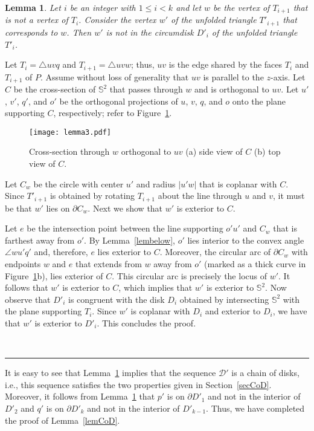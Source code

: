 \documentclass[12pt]{article}
\newtheorem{lemma}{Lemma}
\newcommand{\IS}{\mathbb{S}}
\newcommand{\qed}{\rule{0.5em}{1.5ex}}
\newcommand{\fqed}{{\hfill~\qed}}
\newenvironment{proof}{{\noindent \bf Proof.}}
                      {{\hfill \fqed} \vspace{1em}}
\begin{document}
\begin{lemma}   \label{lemlocallyD} 
Let $i$ be an integer with $1 \leq i < k$ and let $w$ be the vertex of 
$T_{i+1}$ that is not a vertex of $T_i$. Consider the vertex $w'$ of the 
unfolded triangle $T'_{i+1}$ that corresponds to $w$. Then $w'$ is not in 
the circumdisk $D'_i$ of the unfolded triangle $T'_i$.  
\end{lemma} 
\begin{proof}  
Let $T_i = \triangle uvq$ and $T_{i+1} = \triangle uvw$; thus, $uv$ is 
the edge shared by the faces $T_i$ and $T_{i+1}$ of $P$. Assume without 
loss of generality that $uv$ is parallel to the $z$-axis. Let $C$ be 
the cross-section of $\IS^2$ that passes through $w$ and is orthogonal 
to $uv$. Let $u'$, $v'$, $q'$, and $o'$ be the orthogonal projections 
of $u$, $v$, $q$, and $o$ onto the plane supporting $C$, respectively; 
refer to Figure~\ref{fig:lem3}.

\begin{figure}
\centering
\texttt{[image: lemma3.pdf]}
\caption{Cross-section through $w$ orthogonal to $uv$ (a) side view 
of $C$ (b) top view of $C$. }
\label{fig:lem3}
\end{figure}


Let $C_w$ be the circle with center $u'$ and radius $|u'w|$ that is 
coplanar with $C$. Since $T'_{i+1}$ is obtained by rotating $T_{i+1}$ 
about the line through $u$ and $v$, it must be that $w'$ lies on 
$\partial C_w$. Next we show that $w'$ is exterior to $C$.

Let $e$ be the intersection point between the line supporting $o'u'$ 
and $C_w$ that is farthest away from $o'$. By Lemma~\ref{lembelow}, 
$o'$ lies interior to the convex angle $\angle{wu'q'}$ and, therefore, 
$e$ lies exterior to $C$. Moreover, the circular arc of $\partial C_w$ 
with endpoints $w$ and $e$ that extends from $w$ away from $o'$ 
(marked as a thick curve in Figure~\ref{fig:lem3}b), lies exterior of 
$C$. This circular arc is precisely the locus of $w'$. It follows that 
$w'$ is exterior to $C$, which implies that $w'$ is exterior to 
$\IS^2$. Now observe that $D'_i$ is congruent with the disk $D_i$ 
obtained by intersecting $\IS^2$ with the plane supporting $T_i$. 
Since $w'$ is coplanar with $D_i$ and exterior to $D_i$, we have 
that $w'$ is exterior to $D'_i$. This concludes the proof.
\end{proof} 

It is easy to see that Lemma~\ref{lemlocallyD} implies that the sequence 
$\mathcal{D'}$ is a chain of disks, i.e., this sequence satisfies the 
two properties given in Section~\ref{secCoD}. Moreover, it follows from 
Lemma~\ref{lemlocallyD} that $p'$ is on $\partial D'_1$ and not in the 
interior of $D'_2$ and $q'$ is on $\partial D'_k$ and not in the interior 
of $D'_{k-1}$. Thus, we have completed the proof of Lemma~\ref{lemCoD}.    
\end{document}
